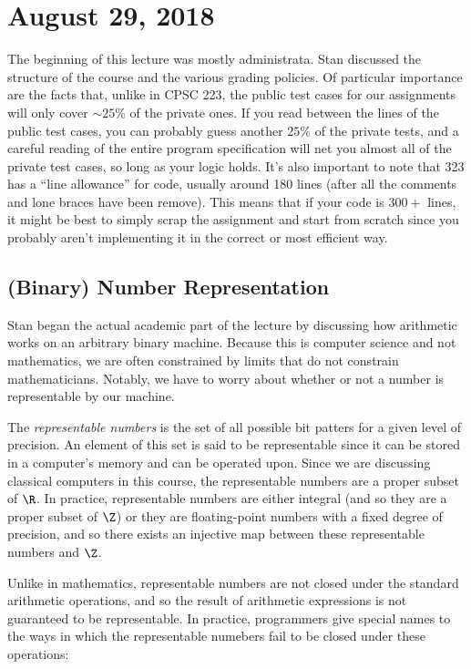 \section{August 29, 2018}

The beginning of this lecture was mostly administrata.
Stan discussed the structure of the course and the various grading policies.
Of particular importance are the facts that, unlike in CPSC 223, the public test cases for our assignments will only cover $\sim 25\%$ of the private ones.
If you read between the lines of the public test cases, you can probably guess another $25\%$ of the private tests, and a careful reading of the entire program specification will net you almost all of the private test cases, so long as your logic holds.
It's also important to note that 323 has a ``line allowance'' for code, usually around 180 lines (after all the comments and lone braces have been remove).
This means that if your code is $300+$ lines, it might be best to simply scrap the assignment and start from scratch since you probably aren't implementing it in the correct or most efficient way.

\subsection*{(Binary) Number Representation}

Stan began the actual academic part of the lecture by discussing how arithmetic works on an arbitrary binary machine.
Because this is computer science and not mathematics, we are often constrained by limits that do not constrain mathematicians.
Notably, we have to worry about whether or not a number is representable by our machine.

\begin{definition}
The \emph{representable numbers} is the set of all possible bit patters for a given level of precision.
An element of this set is said to be representable since it can be stored in a computer's memory and can be operated upon.
Since we are discussing classical computers in this course, the representable numbers are a proper subset of $\R$.
In practice, representable numbers are either integral (and so they are a proper subset of $\Z$) or they are floating-point numbers with a fixed degree of precision, and so there exists an injective map between these representable numbers and $\Z$.
\end{definition}


Unlike in mathematics, representable numbers are not closed under the standard arithmetic operations, and so the result of arithmetic expressions is not guaranteed to be representable.
In practice, programmers give special names to the ways in which the representable numebers fail to be closed under these operations:

